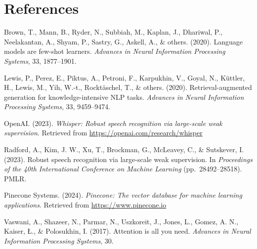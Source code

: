 \documentclass[12pt,a4paper]{report}
\renewcommand{\thesection}{\arabic{section}}
\begin{document}
\newpage
\section*{References}

\begin{flushleft}

Brown, T., Mann, B., Ryder, N., Subbiah, M., Kaplan, J., Dhariwal, P., 
Neelakantan, A., Shyam, P., Sastry, G., Askell, A., \& others. (2020). 
Language models are few-shot learners. \textit{Advances in Neural Information Processing Systems}, 33, 1877--1901.

\vspace{0.5em}

Lewis, P., Perez, E., Piktus, A., Petroni, F., Karpukhin, V., Goyal, N., 
K{\"u}ttler, H., Lewis, M., Yih, W.-t., Rockt{\"a}schel, T., \& others. (2020). 
Retrieval-augmented generation for knowledge-intensive NLP tasks. 
\textit{Advances in Neural Information Processing Systems}, 33, 9459--9474.

\vspace{0.5em}

OpenAI. (2023). \textit{Whisper: Robust speech recognition via large-scale weak supervision}. 
Retrieved from \url{https://openai.com/research/whisper}

\vspace{0.5em}

Radford, A., Kim, J. W., Xu, T., Brockman, G., McLeavey, C., \& Sutskever, I. (2023). 
Robust speech recognition via large-scale weak supervision. 
In \textit{Proceedings of the 40th International Conference on Machine Learning} 
(pp.\ 28492--28518). PMLR.

\vspace{0.5em}

Pinecone Systems. (2024). \textit{Pinecone: The vector database for machine learning applications}. 
Retrieved from \url{https://www.pinecone.io}

\vspace{0.5em}

Vaswani, A., Shazeer, N., Parmar, N., Uszkoreit, J., Jones, L., Gomez, A. N., 
Kaiser, {\L}., \& Polosukhin, I. (2017). 
Attention is all you need. 
\textit{Advances in Neural Information Processing Systems}, 30.

\end{flushleft}


\newpage
\appendix
\renewcommand{\thesection}{Appendix \Alph{section}}
\end{document}
